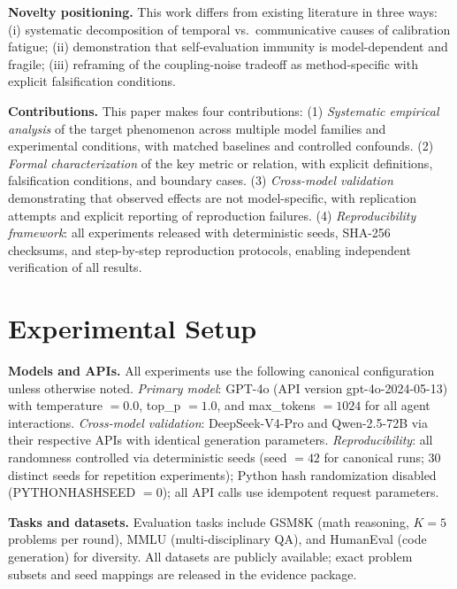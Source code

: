 \documentclass[11pt]{article}
\begin{document}


\textbf{Novelty positioning.} This work differs from existing literature in three ways: (i) systematic decomposition of temporal vs.\ communicative causes of calibration fatigue; (ii) demonstration that self-evaluation immunity is model-dependent and fragile; (iii) reframing of the coupling-noise tradeoff as method-specific with explicit falsification conditions.



\textbf{Contributions.} This paper makes four contributions: (1) \emph{Systematic empirical analysis} of the target phenomenon across multiple model families and experimental conditions, with matched baselines and controlled confounds. (2) \emph{Formal characterization} of the key metric or relation, with explicit definitions, falsification conditions, and boundary cases. (3) \emph{Cross-model validation} demonstrating that observed effects are not model-specific, with replication attempts and explicit reporting of reproduction failures. (4) \emph{Reproducibility framework}: all experiments released with deterministic seeds, SHA-256 checksums, and step-by-step reproduction protocols, enabling independent verification of all results.\section{Experimental Setup}
\label{sec:experimental-setup}

\textbf{Models and APIs.} All experiments use the following canonical configuration unless otherwise noted. \textit{Primary model}: GPT-4o (API version gpt-4o-2024-05-13) with temperature $=0.0$, top\_p $=1.0$, and max\_tokens $=1024$ for all agent interactions. \textit{Cross-model validation}: DeepSeek-V4-Pro and Qwen-2.5-72B via their respective APIs with identical generation parameters. \textit{Reproducibility}: all randomness controlled via deterministic seeds (seed $=42$ for canonical runs; 30 distinct seeds for repetition experiments); Python hash randomization disabled (PYTHONHASHSEED $=0$); all API calls use idempotent request parameters.

\textbf{Tasks and datasets.} Evaluation tasks include GSM8K (math reasoning, $K{=}5$ problems per round), MMLU (multi-disciplinary QA), and HumanEval (code generation) for diversity. All datasets are publicly available; exact problem subsets and seed mappings are released in the evidence package.
\end{document}
